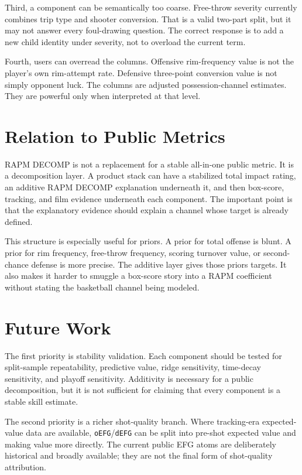 \documentclass[11pt]{article}
\begin{document}
Third, a component can be semantically too coarse.  Free-throw severity currently
combines trip type and shooter conversion.  That is a valid two-part split, but
it may not answer every foul-drawing question.  The correct response is to add a
new child identity under severity, not to overload the current term.

Fourth, users can overread the columns.  Offensive rim-frequency value is not
the player's own rim-attempt rate.  Defensive three-point conversion value is
not simply opponent luck.  The columns are adjusted possession-channel
estimates.  They are powerful only when interpreted at that level.

\section{Relation to Public Metrics}

RAPM DECOMP is not a replacement for a stable all-in-one public metric.  It is a
decomposition layer.  A product stack can have a stabilized total impact rating,
an additive RAPM DECOMP explanation underneath it, and then box-score, tracking,
and film evidence underneath each component.  The important point is that the
explanatory evidence should explain a channel whose target is already defined.

This structure is especially useful for priors.  A prior for total offense is
blunt.  A prior for rim frequency, free-throw frequency, scoring turnover value,
or second-chance defense is more precise.  The additive layer gives those priors
targets.  It also makes it harder to smuggle a box-score story into a RAPM
coefficient without stating the basketball channel being modeled.

\section{Future Work}

The first priority is stability validation.  Each component should be tested for
split-sample repeatability, predictive value, ridge sensitivity, time-decay
sensitivity, and playoff sensitivity.  Additivity is necessary for a public
decomposition, but it is not sufficient for claiming that every component is a
stable skill estimate.

The second priority is a richer shot-quality branch.  Where tracking-era
expected-value data are available, \texttt{oEFG}/\texttt{dEFG} can be split
into pre-shot expected value and making value more directly.  The current
public EFG atoms are deliberately historical and broadly available; they are not
the final form of shot-quality attribution.
\end{document}
